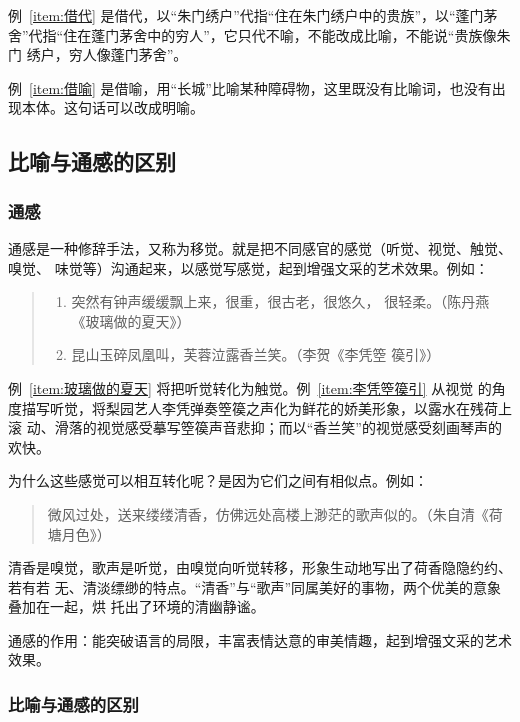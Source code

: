 \documentclass[final,oneside]{ctexbook}
\newenvironment{equotation}{\begin{quotation}\kaishu}{\end{quotation}}
\newenvironment{equote}{\begin{quote}\kaishu}{\end{quote}}
\begin{document}
例~\ref{item:借代} 是借代，以“朱门绣户”代指“住在朱门绣户中的贵族”，以“蓬门茅
舍”代指“住在蓬门茅舍中的穷人”，它只代不喻，不能改成比喻，不能说“贵族像朱门
绣户，穷人像蓬门茅舍”。

例~\ref{item:借喻} 是借喻，用“长城”比喻某种障碍物，这里既没有比喻词，也没有出
现本体。这句话可以改成明喻。

\subsection{比喻与通感的区别}

\subsubsection{通感}

 
通感是一种修辞手法，又称为移觉。就是把不同感官的感觉（听觉、视觉、触觉、嗅觉、
味觉等）沟通起来，以感觉写感觉，起到增强文采的艺术效果。例如：
\begin{equote}
  \begin{enumerate}
    \item \label{item:玻璃做的夏天} 突然有钟声缓缓飘上来，很重，很古老，很悠久，
      很轻柔。（陈丹燕《玻璃做的夏天》）

    \item \label{item:李凭箜篌引} 昆山玉碎凤凰叫，芙蓉泣露香兰笑。（李贺《李凭箜
      篌引》）
  \end{enumerate}
\end{equote}
例~\ref{item:玻璃做的夏天} 将把听觉转化为触觉。例~\ref{item:李凭箜篌引} 从视觉
的角度描写听觉，将梨园艺人李凭弹奏箜篌之声化为鲜花的娇美形象，以露水在残荷上滚
动、滑落的视觉感受摹写箜篌声音悲抑；而以“香兰笑”的视觉感受刻画琴声的欢快。

为什么这些感觉可以相互转化呢？是因为它们之间有相似点。例如：

\begin{equotation}
  微风过处，送来缕缕清香，仿佛远处高楼上渺茫的歌声似的。（朱自清《荷塘月色》）
\end{equotation}
清香是嗅觉，歌声是听觉，由嗅觉向听觉转移，形象生动地写出了荷香隐隐约约、若有若
无、清淡缥缈的特点。“清香”与“歌声”同属美好的事物，两个优美的意象叠加在一起，烘
托出了环境的清幽静谧。

通感的作用：能突破语言的局限，丰富表情达意的审美情趣，起到增强文采的艺术效果。

\subsubsection{比喻与通感的区别}
\end{document}
